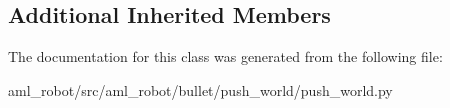 \subsection*{Additional Inherited Members}


The documentation for this class was generated from the following file\-:\begin{DoxyCompactItemize}
\item 
aml\-\_\-robot/src/aml\-\_\-robot/bullet/push\-\_\-world/push\-\_\-world.\-py\end{DoxyCompactItemize}
